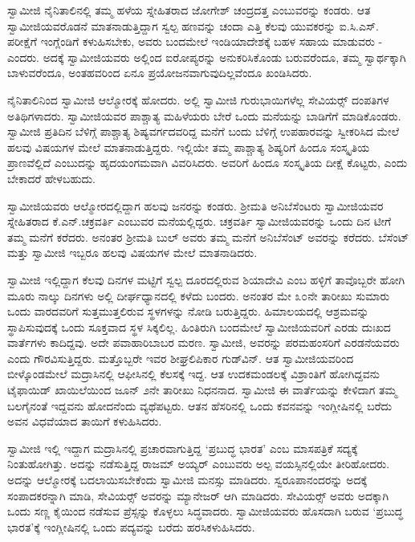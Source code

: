  ಸ್ವಾಮೀಜಿ ನೈನಿತಾಲಿನಲ್ಲಿ ತಮ್ಮ ಹಳೆಯ ಸ್ನೇಹಿತರಾದ ಜೋಗೇಶ್ ಚಂದ್ರದತ್ತ ಎಂಬುವರನ್ನು ಕಂಡರು. ಆತ ಸ್ವಾಮೀಜಿಯವರೊಡನೆ ಮಾತನಾಡುತ್ತಿದ್ದಾಗ ಸ್ವಲ್ಪ ಹಣವನ್ನು ಚಂದಾ ಎತ್ತಿ ಕೆಲವು ಯುವಕರನ್ನು ಐ.ಸಿ.ಎಸ್. ಪರೀಕ್ಷೆಗೆ ಇಂಗ್ಲೆಂಡಿಗೆ ಕಳುಹಿಸಬೇಕು, ಅವರು ಬಂದಮೇಲೆ ಇಂಡಿಯಾದೇಶಕ್ಕೆ ಬಹಳ ಸಹಾಯ ಮಾಡುವರು - ಎಂದರು. ಅದಕ್ಕೆ ಸ್ವಾಮೀಜಿಯವರು ಅಲ್ಲಿಂದ ಐರೋಪ್ಯರನ್ನು ಅನುಕರಿಸಿಕೊಂಡು ಬರುವರೆಂದೂ, ತಮ್ಮ ಸ್ವಾರ್ಥಕ್ಕಾಗಿ ಬಾಳುವರೆಂದೂ, ಅಂತಹವರಿಂದ ಏನೂ ಪ್ರಯೋಜನವಾಗುವುದಿಲ್ಲವೆಂದೂ ಖಂಡಿಸಿದರು. 

 ನೈನಿತಾಲಿನಿಂದ ಸ್ವಾಮೀಜಿ ಆಲ್ಮೋರಕ್ಕೆ ಹೋದರು. ಅಲ್ಲಿ ಸ್ವಾಮೀಜಿ ಗುರುಭಾಯಿಗಳೆಲ್ಲ ಸೇವಿಯರ್ಸ್‍‍ ದಂಪತಿಗಳ ಅತಿಥಿಗಳಾದರು. ಸ್ವಾಮೀಜಿಯವರ ಪಾಶ್ಚಾತ್ಯ ಮಹಿಳೆಯರು ಬೇರೆ ಒಂದು ಮನೆಯನ್ನು ಬಾಡಿಗೆಗೆ ಮಾಡಿಕೊಂಡರು. ಸ್ವಾಮೀಜಿ ಪ್ರತಿದಿನ ಬೆಳಿಗ್ಗೆ ಪಾಶ್ಚಾತ್ಯ ಶಿಷ್ಯವರ್ಗದವರಿದ್ದ ಮನೆಗೆ ಬಂದು ಬೆಳಿಗ್ಗೆ ಉಪಹಾರವನ್ನು ಸ್ವೀಕರಿಸಿದ ಮೇಲೆ ಹಲವು ವಿಷಯಗಳ ಮೇಲೆ ಮಾತನಾಡುತ್ತಿದ್ದರು. ಇಲ್ಲಿಯೇ ತಮ್ಮ ಪಾಶ್ಚಾತ್ಯ ಶಿಷ್ಯರಿಗೆ ಹಿಂದೂ ಸಂಸ್ಕೃತಿಯ ಪ್ರಾಣವೆಲ್ಲಿದೆ ಎಂಬುದನ್ನು ಹೃದಯಂಗಮವಾಗಿ ವಿವರಿಸಿದರು. ಅವರಿಗೆ ಹಿಂದೂ ಸಂಸ್ಕೃತಿಯ ದೀಕ್ಷೆ ಕೊಟ್ಟರು, ಎಂದು ಬೇಕಾದರೆ ಹೇಳಬಹುದು. 

 ಸ್ವಾಮೀಜಿಯವರು ಆಲ್ಮೋರದಲ್ಲಿದ್ದಾಗ ಹಲವು ಜನರನ್ನು ಕಂಡರು. ಶ‍್ರೀಮತಿ ಅನಿಬೆಸೆಂಟರು ಸ್ವಾಮೀಜಿಯವರ ಸ್ನೇಹಿತರಾದ ಕೆ.ಎನ್.ಚಕ್ರವರ್ತಿ ಎಂಬುವರ ಮನೆಯಲ್ಲಿದ್ದರು. ಚಕ್ರವರ್ತಿ ಸ್ವಾಮೀಜಿಯವರನ್ನು ಒಂದು ದಿನ ಟೀಗೆ ತಮ್ಮ ಮನೆಗೆ ಕರೆದರು. ಅನಂತರ ಶ‍್ರೀಮತಿ ಬುಲ್ ಅವರು ತಮ್ಮ ಮನೆಗೆ ಅನಿಬೆಸೆಂಟ್ ಅವರನ್ನು ಕರೆದರು. ಬೆಸೆಂಟ್ ಮತ್ತು ಸ್ವಾಮೀಜಿ ಇಬ್ಬರೂ ಹಲವು ವಿಷಯಗಳ ಮೇಲೆ ಮಾತನಾಡಿದರು. 

 ಸ್ವಾಮೀಜಿ ಇಲ್ಲಿದ್ದಾಗ ಕೆಲವು ದಿನಗಳ ಮಟ್ಟಿಗೆ ಸ್ವಲ್ಪ ದೂರದಲ್ಲಿರುವ ಶಿಯಾದೇವಿ ಎಂಬ ಹಳ್ಳಿಗೆ ತಾವೊಬ್ಬರೇ ಹೋಗಿ ಮೂರು ನಾಲ್ಕು ದಿನಗಳು ಅಲ್ಲಿ ದೀರ್ಘಧ್ಯಾನದಲ್ಲಿ ಕಳೆದು ಬಂದರು. ಅನಂತರ ಮೇ ೩೦ನೇ ತಾರೀಖು ಸುಮಾರು ಒಂದು ವಾರದವರಿಗೆ ಸುತ್ತಮುತ್ತಲಿರುವ ಸ್ಥಳಗಳನ್ನು ನೋಡಿ ಬರುತ್ತಿದ್ದರು. ಹಿಮಾಲಯದಲ್ಲಿ ಆಶ್ರಮವನ್ನು ಸ್ಥಾಪಿಸುವುದಕ್ಕೆ ಒಂದು ಸೂಕ್ತವಾದ ಸ್ಥಳ ಸಿಕ್ಕಲಿಲ್ಲ. ಹಿಂತಿರುಗಿ ಬಂದಮೇಲೆ ಸ್ವಾಮೀಜಿಯವರಿಗೆ ಎರಡು ದುಃಖದ ವಾರ್ತೆಗಳು ಕಾದಿದ್ದವು. ಅದೇ ಪವಾಹಾರಿಬಾಬರ ಮರಣ. ಸ್ವಾಮೀಜಿ, ಅವರನ್ನು ಪರಮಹಂಸರಿಗೆ ಎರಡನೆಯವರು ಎಂದು ಗೌರವಿಸುತ್ತಿದ್ದರು. ಮತ್ತೊಬ್ಬರೇ ಇವರ ಶೀಘ್ರಲಿಪಿಕಾರ ಗುಡ್‍ವಿನ್. ಆತ ಸ್ವಾಮೀಜಿಯವರಿಂದ ಬೀಳ್ಕೊಂಡಮೇಲೆ ಮದ್ರಾಸಿನಲ್ಲಿ  ಆಫೀಸಿನಲ್ಲಿ ಕೆಲಸಕ್ಕೆ ಇದ್ದ. ಆತ ಉದಕಮಂಡಲಕ್ಕೆ ವಿಶ್ರಾಂತಿಗೆ ಹೋಗಿದ್ದವನು ಟೈಫಾಯಿಡ್ ಖಾಯಿಲೆಯಿಂದ ಜೂನ್ ೨ನೇ ತಾರೀಖು ನಿಧನನಾದ. ಸ್ವಾಮೀಜಿ ಈ ವಾರ್ತೆಯನ್ನು ಕೇಳಿದಾಗ ತಮ್ಮ ಬಲಗೈನಂತೆ ಇದ್ದವನು ಹೋದನೆಂದು ವ್ಯಥೆಪಟ್ಟರು. ಆತನ ಹೆಸರಿನಲ್ಲಿ ಒಂದು ಕವನವನ್ನು ಇಂಗ್ಲೀಷಿನಲ್ಲಿ ಬರೆದು ಅವನ ವಿಧವೆಯಾದ ತಾಯಿಗೆ ಕಳುಹಿಸಿದರು. 

 ಸ್ವಾಮೀಜಿ ಇಲ್ಲಿ ಇದ್ದಾಗ ಮದ್ರಾಸಿನಲ್ಲಿ ಪ್ರಚಾರವಾಗುತ್ತಿದ್ದ ‘ಪ್ರಬುದ್ಧ ಭಾರತ’ ಎಂಬ ಮಾಸಪತ್ರಿಕೆ ಸದ್ಯಕ್ಕೆ ನಿಂತುಹೋಗಿತ್ತು. ಅದನ್ನು ನಡೆಸುತ್ತಿದ್ದ ರಾಜಮ್ ಅಯ್ಯರ್ ಎಂಬುವರು ಅಲ್ಪ ವಯಸ್ಸಿನಲ್ಲಿಯೇ ತೀರಿಹೋದರು. ಅದನ್ನು ಆಲ್ಮೋರಕ್ಕೆ ಬದಲಾಯಿಸಬೇಕೆಂದು ಸ್ವಾಮೀಜಿ ಮನಸ್ಸು ಮಾಡಿದರು. ಸ್ವರೂಪಾನಂದರನ್ನು ಅದಕ್ಕೆ ಸಂಪಾದಕರನ್ನಾಗಿ ಮಾಡಿ, ಸೇವಿಯರ್ಸ್‍‍ ಅವರನ್ನು ಮ್ಯಾನೇಜರ್ ಆಗಿ ಮಾಡಿದರು. ಸೇವಿಯರ್ಸ್‍‍ ಅವರು ಅದಕ್ಕಾಗಿ ಒಂದು ಸಣ್ಣ ಕೈಯಿಂದ ನಡೆಸುವ ಪ್ರೆಸ್ಸನ್ನು ಕೊಳ್ಳಲು ಸಿದ್ಧವಾದರು. ಸ್ವಾಮೀಜಿಯವರು ಹೊಸದಾಗಿ ಬರುವ ‘ಪ್ರಬುದ್ಧ ಭಾರತ’ಕ್ಕೆ ಇಂಗ್ಲೀಷಿನಲ್ಲಿ ಒಂದು ಪದ್ಯವನ್ನು ಬರೆದು ಹರಸಿಕಳುಹಿಸಿದರು. 

